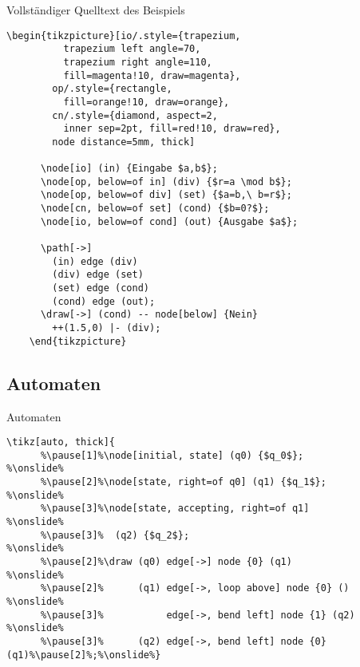 \begin{Frame}{Vollständiger Quelltext des Beispiels}
  \begin{lstlisting}[gobble=4]
    \begin{tikzpicture}[io/.style={trapezium,
          trapezium left angle=70,
          trapezium right angle=110,
          fill=magenta!10, draw=magenta},
        op/.style={rectangle,
          fill=orange!10, draw=orange},
        cn/.style={diamond, aspect=2,
          inner sep=2pt, fill=red!10, draw=red},
        node distance=5mm, thick]
    
      \node[io] (in) {Eingabe $a,b$};
      \node[op, below=of in] (div) {$r=a \mod b$};
      \node[op, below=of div] (set) {$a=b,\ b=r$};
      \node[cn, below=of set] (cond) {$b=0?$};
      \node[io, below=of cond] (out) {Ausgabe $a$};
      
      \path[->]
        (in) edge (div)
        (div) edge (set)
        (set) edge (cond)
        (cond) edge (out);
      \draw[->] (cond) -- node[below] {Nein}
        ++(1.5,0) |- (div);
    \end{tikzpicture}
  \end{lstlisting}
\end{Frame}

\subsection{Automaten}

\begin{Frame}[fragile]{Automaten}

  \xxx

  \begin{lstlisting}[gobble=4,escapechar=\%]
    \tikz[auto, thick]{
      %\pause[1]%\node[initial, state] (q0) {$q_0$};            %\onslide%
      %\pause[2]%\node[state, right=of q0] (q1) {$q_1$};        %\onslide%
      %\pause[3]%\node[state, accepting, right=of q1]           %\onslide%
      %\pause[3]%  (q2) {$q_2$};                                %\onslide%
      %\pause[2]%\draw (q0) edge[->] node {0} (q1)              %\onslide%
      %\pause[2]%      (q1) edge[->, loop above] node {0} ()    %\onslide%
      %\pause[3]%           edge[->, bend left] node {1} (q2)   %\onslide%
      %\pause[3]%      (q2) edge[->, bend left] node {0} (q1)%\pause[2]%;%\onslide%}
  \end{lstlisting}
\end{Frame}

